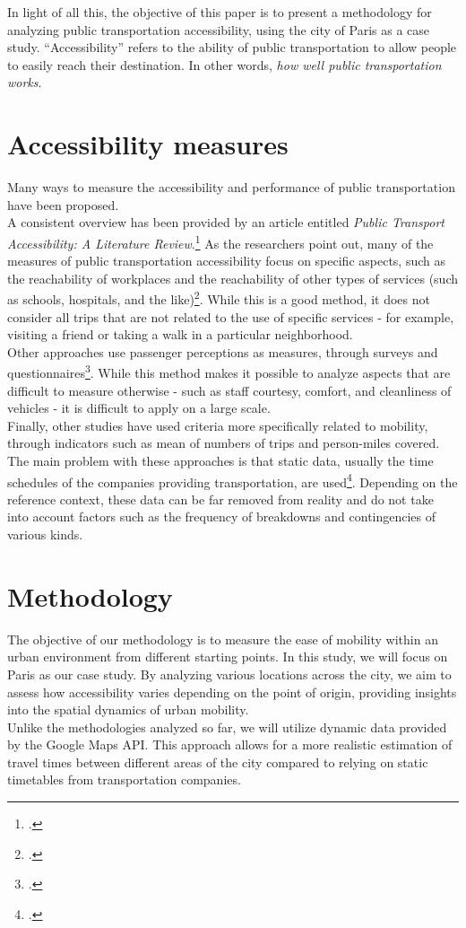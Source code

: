 \documentclass[a4paper,12pt]{article}
\begin{document}
In light of all this, the objective of this paper is to present a methodology for analyzing public transportation accessibility, using the city of Paris as a case study. “Accessibility” refers to the ability of public transportation to allow people to easily reach their destination. In other words, \emph{how well public transportation works}.

\section{Accessibility measures}

Many ways to measure the accessibility and performance of public transportation have been proposed.\\
A consistent overview has been provided by an article entitled \emph{Public Transport Accessibility: A Literature Review}.\footcite{saif2019}
As the researchers point out, many of the measures of public transportation accessibility focus on specific aspects, such as the reachability of workplaces and the reachability of other types of services (such as schools, hospitals, and the like)\footcite{fransen2015}. While this is a good method, it does not consider all trips that are not related to the use of specific services - for example, visiting a friend or taking a walk in a particular neighborhood.\\
Other approaches use passenger perceptions as measures, through surveys and questionnaires\footcite{lattman2016}. While this method makes it possible to analyze aspects that are difficult to measure otherwise - such as staff courtesy, comfort, and cleanliness of vehicles - it is difficult to apply on a large scale.\\
Finally, other studies have used criteria more specifically related to mobility, through indicators such as mean of numbers of trips and person-miles covered. The main problem with these approaches is that static data, usually the time schedules of the companies providing transportation, are used\footcite{cheng2018}. Depending on the reference context, these data can be far removed from reality and do not take into account factors such as the frequency of breakdowns and contingencies of various kinds.

\section{Methodology}
The objective of our methodology is to measure the ease of mobility within an urban environment from different starting points. In this study, we will focus on Paris as our case study. By analyzing various locations across the city, we aim to assess how accessibility varies depending on the point of origin, providing insights into the spatial dynamics of urban mobility.\\
Unlike the methodologies analyzed so far, we will utilize dynamic data provided by the Google Maps API. This approach allows for a more realistic estimation of travel times between different areas of the city compared to relying on static timetables from transportation companies.
\end{document}
